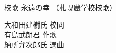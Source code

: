 ﻿\documentclass[10pt,a5j]{tarticle} %
\begin{document}
\thispagestyle{empty} %
\newcommand{\linespace}{1.0em} %
\newcommand{\blocksize}{0.33\hsize} %

\begin{minipage}[c]{0.7\hsize}
	\begin{center}
		{\normalsize 
			校歌
		}
		{\LARGE
			永遠の幸
		}
		{\small 
			（札幌農学校校歌）
		}
	\end{center}
\end{minipage}
\begin{minipage}[c]{0.3\hsize}
	\begin{flushright}%
		大和田建樹氏 校閲\\ 
		有島武朗君 作歌\\ 
		納所弁次郎氏 選曲
	\end{flushright}
\end{minipage}
\end{document}

